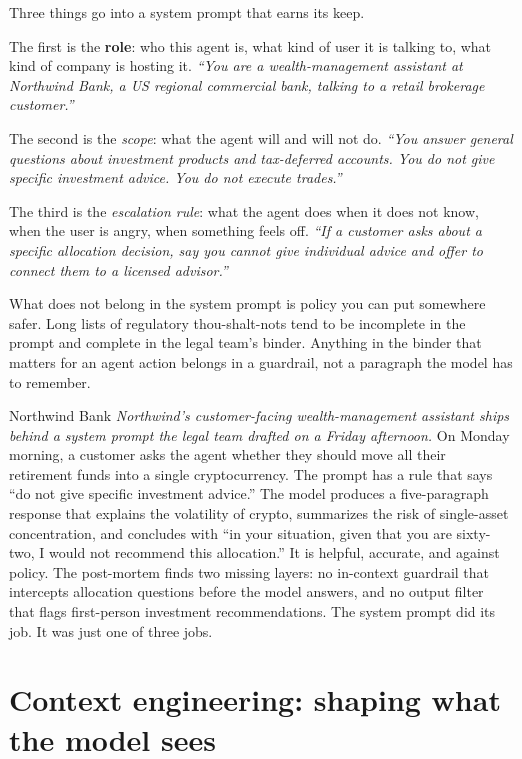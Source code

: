 Three things go into a system prompt that earns its keep.

The first is the \textbf{role}: who this agent is, what kind of user it is talking to, what kind of company is hosting it. \textit{``You are a wealth-management assistant at Northwind Bank, a US regional commercial bank, talking to a retail brokerage customer.''}

The second is the \textit{scope}: what the agent will and will not do. \textit{``You answer general questions about investment products and tax-deferred accounts. You do not give specific investment advice. You do not execute trades.''}

The third is the \textit{escalation rule}: what the agent does when it does not know, when the user is angry, when something feels off. \textit{``If a customer asks about a specific allocation decision, say you cannot give individual advice and offer to connect them to a licensed advisor.''}

What does not belong in the system prompt is policy you can put somewhere safer. Long lists of regulatory thou-shalt-nots tend to be incomplete in the prompt and complete in the legal team's binder. Anything in the binder that matters for an agent action belongs in a guardrail, not a paragraph the model has to remember.

\begin{TNinpractice}{Northwind Bank} \textit{Northwind's customer-facing wealth-management assistant ships behind a system prompt the legal team drafted on a Friday afternoon.} On Monday morning, a customer asks the agent whether they should move all their retirement funds into a single cryptocurrency. The prompt has a rule that says ``do not give specific investment advice.'' The model produces a five-paragraph response that explains the volatility of crypto, summarizes the risk of single-asset concentration, and concludes with ``in your situation, given that you are sixty-two, I would not recommend this allocation.'' It is helpful, accurate, and against policy. The post-mortem finds two missing layers: no in-context guardrail that intercepts allocation questions before the model answers, and no output filter that flags first-person investment recommendations. The system prompt did its job. It was just one of three jobs. \end{TNinpractice}

\section{Context engineering: shaping what the model sees}

